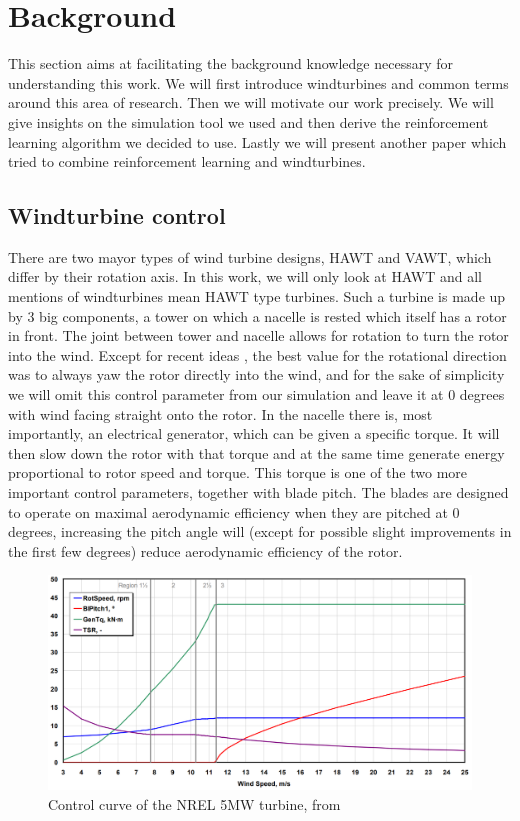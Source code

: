 \documentclass[hyperref,beleg]{cgvpub}
\begin{document}
\chapter{Background}

This section aims at facilitating the background knowledge necessary for understanding this work. We will first introduce windturbines and common terms around this area of research. Then we will motivate our work precisely. We will give insights on the simulation tool we used and then derive the reinforcement learning algorithm we decided to use. Lastly we will present another paper which tried to combine reinforcement learning and windturbines.

\section{Windturbine control}
There are two mayor types of wind turbine designs, \ac{HAWT} and \ac{VAWT}, which differ by their rotation axis. In this work, we will only look at \ac{HAWT} and all mentions of windturbines mean \ac{HAWT} type turbines. Such a turbine is made up by 3 big components, a tower on which a nacelle is rested which itself has a rotor in front. 
The joint between tower and nacelle allows for rotation to turn the rotor into the wind. Except for recent ideas \cite{howlandWindFarmPower2019}, the best value for the rotational direction was to always yaw the rotor directly into the wind, and for the sake of simplicity we will omit this control parameter from our simulation and leave it at 0 degrees with wind facing straight onto the rotor.
In the nacelle there is, most importantly, an electrical generator, which can be given a specific torque. It will then slow down the rotor with that torque and at the same time generate energy proportional to rotor speed and torque. This torque is one of the two more important control parameters, together with blade pitch. The blades are designed to operate on maximal aerodynamic efficiency when they are pitched at 0 degrees, increasing the pitch angle will (except for possible slight improvements in the first few degrees) reduce aerodynamic efficiency of the rotor.

\begin{figure}
  \centering
  \includegraphics{images/NREL-5MW.png}
  \caption{Control curve of the NREL 5MW turbine, from \cite{jonkmanDefinition5MWReference2009}}
  \label{fig:nrel5mw}
\end{figure}
\end{document}
